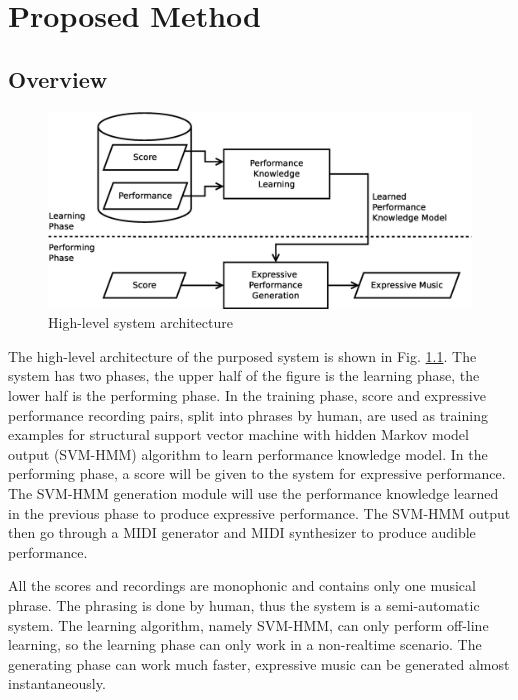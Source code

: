 \chapter{Proposed Method}
\label{chap:proposed}
\section{Overview}
      \begin{figure}[tp]
         \begin{center}
            \includegraphics[width=\textwidth]{fig/high_lev_arch}
         \end{center}
         \caption{High-level system architecture} 
         \label{fig:flow}
      \end{figure}
The high-level architecture of the purposed system is shown in Fig. \ref{fig:flow}. The system has two phases, the upper half of the figure is the learning phase, the lower half is the performing phase. In the training phase, score and expressive performance recording pairs, split into phrases by human, are used as training examples for structural support vector machine with hidden Markov model output (SVM-HMM) algorithm to learn performance knowledge model. In the performing phase, a score will be given to the system for expressive performance. The SVM-HMM generation module will use the performance knowledge learned in the previous phase to produce expressive performance. The SVM-HMM output then go through a MIDI generator and MIDI synthesizer to produce audible performance.

All the scores and recordings are monophonic and contains only one musical phrase. The phrasing is done by human, thus the system is a semi-automatic system. The learning algorithm, namely SVM-HMM, can only perform off-line learning, so the learning phase can only work in a non-realtime scenario. The generating phase can work much faster, expressive music can be generated almost instantaneously. 

